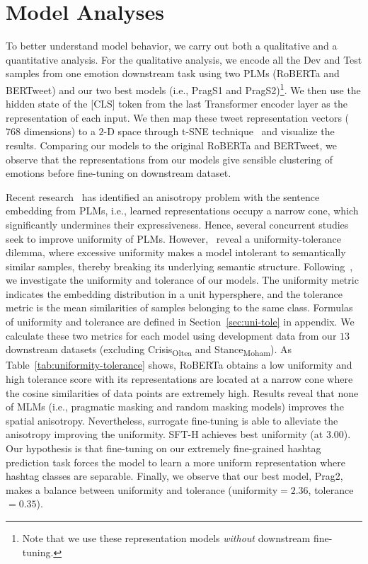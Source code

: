 \section{Model Analyses}
 To better understand model behavior, we carry out both a qualitative and a quantitative analysis. For the qualitative analysis, we encode all the Dev and Test samples from one emotion downstream task using two PLMs (RoBERTa and BERTweet) and our two best models (i.e., PragS1 and PragS2)\footnote{Note that we use these representation models \textit{without} downstream fine-tuning.}. We then use the hidden state of the [CLS] token from the last Transformer encoder layer as the representation of each input. We then map these tweet representation vectors ($768$ dimensions) to a $2$-D space through t-SNE technique~\cite{van2008visualizing} and visualize the results. Comparing our models to the original RoBERTa and BERTweet, we observe that the representations from our models give sensible clustering of emotions before fine-tuning on downstream dataset. %
 
 
 
Recent research~\cite{ethayarajh-2019-contextual, li-etal-2020-sentence, gao-etal-2021-simcse} has identified an anisotropy problem with the sentence embedding from PLMs, i.e., learned representations occupy a narrow cone, which significantly undermines their expressiveness. Hence, several concurrent studies~\cite{gao-etal-2021-simcse, liu2021fast} seek to improve uniformity of PLMs. However,~\citet{wang-2021-understanding} reveal a uniformity-tolerance dilemma, where excessive uniformity makes a model intolerant to semantically similar samples, thereby breaking its underlying semantic structure. Following~\citet{wang-2021-understanding}, we investigate the uniformity and tolerance of our models. The uniformity metric indicates the embedding distribution in a unit hypersphere, and the tolerance metric is the mean similarities of samples belonging to the same class. Formulas of uniformity and tolerance are defined in Section~\ref{sec:uni-tole} in appendix. We calculate these two metrics for each model using development data from our $13$ downstream datasets (excluding Crisis\textsubscript{Oltea} and Stance\textsubscript{Moham}). As Table~\ref{tab:uniformity-tolerance} shows, RoBERTa obtains a low uniformity and high tolerance score with its representations are located at a narrow cone where the cosine similarities of data points are extremely high. Results reveal that none of MLMs (i.e., pragmatic masking and random masking models) improves the spatial anisotropy. Nevertheless, surrogate fine-tuning is able to alleviate the anisotropy improving the uniformity. SFT-H achieves best uniformity (at $3.00$). Our hypothesis is that fine-tuning on our extremely fine-grained hashtag prediction task forces the model to learn a more uniform representation where hashtag classes are separable. Finally, we observe that our best model, Prag2, makes a balance between uniformity and tolerance (uniformity$=2.36$, tolerance$=0.35$). 
 
